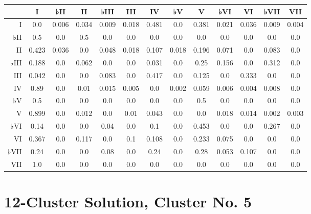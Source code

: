 \begin{table}[htbp]
\begin{minipage}{\linewidth}
\setlength{\tymax}{0.5\linewidth}
\centering
\small
\begin{tabulary}{\textwidth}{@{}RCCCCCCCCCCCC@{}} \toprule
&I&♭II&II&♭III&III&IV&♭V&V&♭VI&VI&♭VII&VII\\
\midrule
I&0.0&0.006&0.034&0.009&0.018&0.481&0.0&0.381&0.021&0.036&0.009&0.004\\
♭II&0.5&0.0&0.5&0.0&0.0&0.0&0.0&0.0&0.0&0.0&0.0&0.0\\
II&0.423&0.036&0.0&0.048&0.018&0.107&0.018&0.196&0.071&0.0&0.083&0.0\\
♭III&0.188&0.0&0.062&0.0&0.0&0.031&0.0&0.25&0.156&0.0&0.312&0.0\\
III&0.042&0.0&0.0&0.083&0.0&0.417&0.0&0.125&0.0&0.333&0.0&0.0\\
IV&0.89&0.0&0.01&0.015&0.005&0.0&0.002&0.059&0.006&0.004&0.008&0.0\\
♭V&0.5&0.0&0.0&0.0&0.0&0.0&0.0&0.5&0.0&0.0&0.0&0.0\\
V&0.899&0.0&0.012&0.0&0.01&0.043&0.0&0.0&0.018&0.014&0.002&0.003\\
♭VI&0.14&0.0&0.0&0.04&0.0&0.1&0.0&0.453&0.0&0.0&0.267&0.0\\
VI&0.367&0.0&0.117&0.0&0.1&0.108&0.0&0.233&0.075&0.0&0.0&0.0\\
♭VII&0.24&0.0&0.0&0.08&0.0&0.24&0.0&0.28&0.053&0.107&0.0&0.0\\
VII&1.0&0.0&0.0&0.0&0.0&0.0&0.0&0.0&0.0&0.0&0.0&0.0\\

\bottomrule

\end{tabulary}
\end{minipage}
\end{table}

\section{12-Cluster Solution, Cluster No. 5}
\label{12-clustersolutionclusterno.5}

